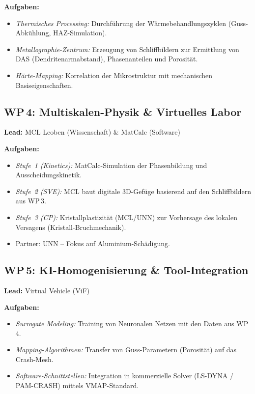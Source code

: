 \documentclass[12pt,a4paper]{article}
\begin{document}
\textbf{Aufgaben:}
\begin{itemize}[leftmargin=*]
  \item \emph{Thermisches Processing:} Durchführung der
        Wärmebehandlungszyklen (Guss-Abkühlung, HAZ-Simulation).
  \item \emph{Metallographie-Zentrum:} Erzeugung von Schliffbildern zur
        Ermittlung von DAS (Dendritenarmabstand), Phasenanteilen und
        Porosität.
  \item \emph{Härte-Mapping:} Korrelation der Mikrostruktur mit mechanischen
        Basiseigenschaften.
\end{itemize}

\subsection{WP\,4: Multiskalen-Physik \& Virtuelles Labor}
\textbf{Lead:} MCL Leoben (Wissenschaft) \& MatCalc (Software)

\textbf{Aufgaben:}
\begin{itemize}[leftmargin=*]
  \item \emph{Stufe~1 (Kinetics):} MatCalc-Simulation der Phasenbildung und
        Ausscheidungskinetik.
  \item \emph{Stufe~2 (SVE):} MCL baut digitale 3D-Gefüge basierend auf den
        Schliffbildern aus WP\,3.
  \item \emph{Stufe~3 (CP):} Kristallplastizität (MCL/UNN) zur Vorhersage
        des lokalen Versagens (Kristall-Bruchmechanik).
  \item Partner: UNN -- Fokus auf Aluminium-Schädigung.
\end{itemize}

\subsection{WP\,5: KI-Homogenisierung \& Tool-Integration}
\textbf{Lead:} Virtual Vehicle (ViF)

\textbf{Aufgaben:}
\begin{itemize}[leftmargin=*]
  \item \emph{Surrogate Modeling:} Training von Neuronalen Netzen mit den
        Daten aus WP\,4.
  \item \emph{Mapping-Algorithmen:} Transfer von Guss-Parametern (Porosität)
        auf das Crash-Mesh.
  \item \emph{Software-Schnittstellen:} Integration in kommerzielle Solver
        (LS-DYNA / PAM-CRASH) mittels VMAP-Standard.
\end{itemize}
\end{document}
